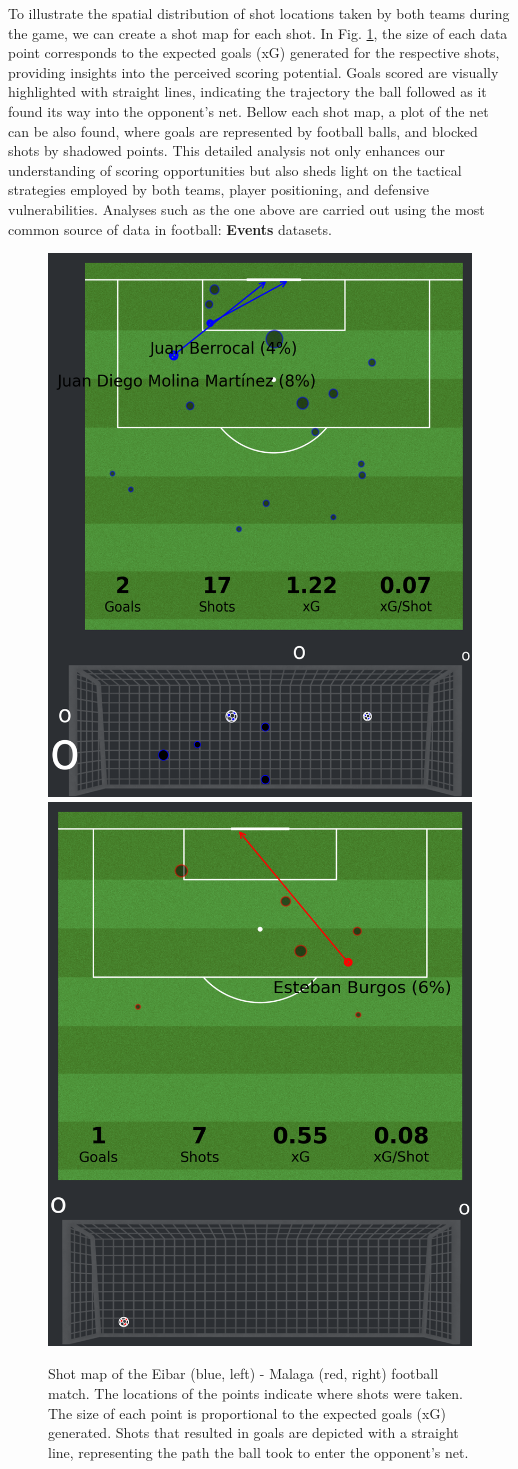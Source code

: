\documentclass[
  10pt,
  twoside,nohyper]{book}
\begin{document}
To illustrate the spatial distribution of shot locations taken by both teams during the game, we can create a shot map for each shot. In Fig. \ref{fig:shotmap}, the size of each data point corresponds to the expected goals (xG) generated for the respective shots, providing insights into the perceived scoring potential. Goals scored are visually highlighted with straight lines, indicating the trajectory the ball followed as it found its way into the opponent's net. Bellow each shot map, a plot of the net can be also found, where goals are represented by football balls, and blocked shots by shadowed points. This detailed analysis not only enhances our understanding of scoring opportunities but also sheds light on the tactical strategies employed by both teams, player positioning, and defensive vulnerabilities. Analyses such as the one above are carried out using the most common
source of data in football: \textbf{Events} datasets.

\begin{figure}[H]

{\centering \includegraphics[width=0.45\linewidth,]{imagenes/home_shot_map} \includegraphics[width=0.45\linewidth,]{imagenes/away_shot_map} 

}

\caption{Shot map of the Eibar (blue, left) - Malaga (red, right) football match. The locations of the points indicate where shots were taken. The size of each point is proportional to the expected goals (xG) generated. Shots that resulted in goals are depicted with a straight line, representing the path the ball took to enter the opponent’s net.}\label{fig:shotmap}
\end{figure}
\end{document}
